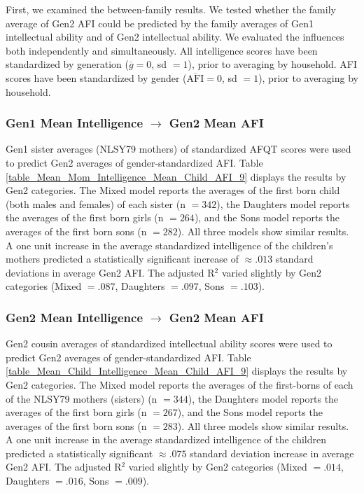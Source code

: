 First, we examined the between-family results. We tested whether the family average of Gen2 AFI could be predicted by the family averages of Gen1 intellectual ability and of Gen2 intellectual ability. We evaluated the influences both independently and simultaneously. All intelligence scores have been standardized by generation ($\overline{g} = 0$, sd $= 1$), prior to averaging by household. AFI scores have been standardized by gender ($\overline{\mathrm{AFI}} = 0$, sd $= 1$), prior to averaging by household.

\subsubsection{Gen1 Mean Intelligence $\rightarrow$ Gen2 Mean AFI} Gen1 sister averages (NLSY79 mothers) of standardized AFQT scores were used to predict Gen2 averages of gender-standardized AFI. Table \ref{table_Mean_Mom_Intelligence_Mean_Child_AFI_9} displays the results by Gen2 categories. The Mixed model reports the averages of the first born child (both males and females) of each sister (n $= 342$), the Daughters model reports the averages of the first born girls (n $= 264$), and the Sons model reports the averages of the first born sons (n $= 282$). All three models show similar results. A one unit increase in the average standardized intelligence of the children's mothers predicted a statistically significant increase of $\approx .013$ standard deviations in average Gen2 AFI. The adjusted R$^{2}$ varied slightly by Gen2 categories (Mixed $= .087$, Daughters $= .097$, Sons $= .103$).

\subsubsection{Gen2 Mean Intelligence $\rightarrow$ Gen2 Mean AFI} Gen2 cousin averages of standardized intellectual ability scores were used to predict Gen2 averages of gender-standardized AFI. Table \ref{table_Mean_Child_Intelligence_Mean_Child_AFI_9} displays the results by Gen2 categories. The Mixed model reports the averages of the first-borns of each of the NLSY79 mothers (sisters) (n $= 344$), the Daughters model reports the averages of the first born girls (n $= 267$), and the Sons model reports the averages of the first born sons (n $= 283$). All three models show similar results. A one unit increase in the average standardized intelligence of the children predicted a statistically significant $\approx .075$ standard deviation increase in average Gen2 AFI. The adjusted R$^{2}$ varied slightly by Gen2 categories (Mixed $= .014$, Daughters $= .016$, Sons $= .009$).

